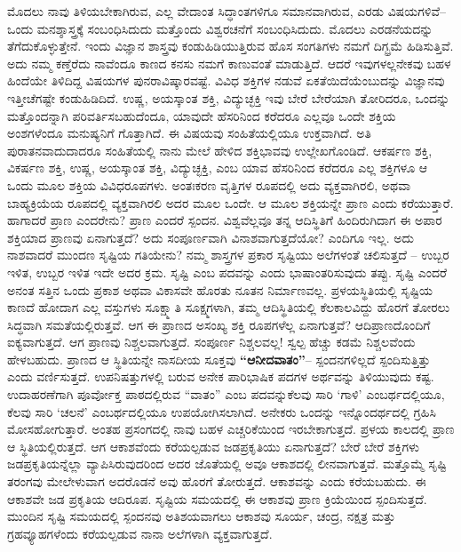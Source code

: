 ಮೊದಲು ನಾವು ತಿಳಿಯಬೇಕಾಗಿರುವ, ಎಲ್ಲ ವೇದಾಂತ ಸಿದ್ಧಾಂತಗಳಿಗೂ ಸಮಾನವಾಗಿರುವ, ಎರಡು ವಿಷಯಗಳಿವೆ–ಒಂದು ಮನಶ್ಶಾಸ್ತ್ರಕ್ಕೆ ಸಂಬಂಧಿಸಿದುದು ಮತ್ತೊಂದು ವಿಶ್ವರಚನೆಗೆ ಸಂಬಂಧಿಸಿದುದು. ಮೊದಲು ಎರಡನೆಯದನ್ನು ತೆಗೆದುಕೊಳ್ಳುತ್ತೇನೆ. ಇಂದು ವಿಜ್ಞಾನ ಶಾಸ್ತ್ರವು ಕಂಡುಹಿಡಿಯುತ್ತಿರುವ ಹೊಸ ಸಂಗತಿಗಳು ನಮಗೆ ದಿಗ್ಭ್ರಮೆ ಹಿಡಿಸುತ್ತಿವೆ. ಅದು ನಮ್ಮ ಕಣ್ತೆರೆದು ನಾವೆಂದೂ ಕಾಣದ ಕನಸು ನಮಗೆ ಕಾಣುವಂತೆ ಮಾಡುತ್ತಿದೆ. ಆದರೆ ಇವುಗಳಲ್ಲನೇಕವು ಬಹಳ ಹಿಂದೆಯೇ ತಿಳಿದಿದ್ದ ವಿಷಯಗಳ ಪುನರಾವಿಷ್ಕಾರವಷ್ಟೆ. ವಿವಿಧ ಶಕ್ತಿಗಳ ನಡುವೆ ಏಕತೆಯಿದೆಯೆಂಬುದನ್ನು ವಿಜ್ಞಾನವು ಇತ್ತೀಚೆಗಷ್ಟೇ ಕಂಡುಹಿಡಿದಿದೆ. ಉಷ್ಣ, ಅಯಸ್ಕಾಂತ ಶಕ್ತಿ, ವಿದ್ಯುಚ್ಛಕ್ತಿ ಇವು ಬೇರೆ ಬೇರೆಯಾಗಿ ತೋರಿದರೂ, ಒಂದನ್ನು ಮತ್ತೊಂದನ್ನಾಗಿ ಪರಿವರ್ತಿಸಬಹುದೆಂದೂ, ಯಾವುದೇ ಹೆಸರಿನಿಂದ ಕರೆದರೂ ಎಲ್ಲವೂ ಒಂದೇ ಶಕ್ತಿಯ ಅಂಶಗಳೆಂದೂ ಮನುಷ್ಯನಿಗೆ ಗೊತ್ತಾಗಿದೆ. ಈ ವಿಷಯವು ಸಂಹಿತೆಯಲ್ಲಿಯೂ ಉಕ್ತವಾಗಿದೆ. ಅತಿ ಪುರಾತನವಾದುದಾದರೂ ಸಂಹಿತೆಯಲ್ಲಿ ನಾನು ಮೇಲೆ ಹೇಳಿದ ಶಕ್ತಿಭಾವವು ಉಲ್ಲೇಖಗೊಂಡಿದೆ. ಆಕರ್ಷಣ ಶಕ್ತಿ, ವಿಕರ್ಷಣ ಶಕ್ತಿ, ಉಷ್ಣ, ಅಯಸ್ಕಾಂತ ಶಕ್ತಿ, ವಿದ್ಯುಚ್ಛಕ್ತಿ, ಎಂಬ ಯಾವ ಹೆಸರಿನಿಂದ ಕರೆದರೂ ಎಲ್ಲ ಶಕ್ತಿಗಳೂ ಆ ಒಂದು ಮೂಲ ಶಕ್ತಿಯ ವಿವಿಧರೂಪಗಳು. ಅಂತಃಕರಣ ವೃತ್ತಿಗಳ ರೂಪದಲ್ಲಿ ಅದು ವ್ಯಕ್ತವಾಗಿರಲಿ, ಅಥವಾ ಬಾಹ್ಯಕ್ರಿಯೆಯ ರೂಪದಲ್ಲಿ ವ್ಯಕ್ತವಾಗಿರಲಿ ಅದರ ಮೂಲ ಒಂದೇ. ಆ ಮೂಲ ಶಕ್ತಿಯನ್ನೇ ಪ್ರಾಣ ಎಂದು ಕರೆಯುತ್ತಾರೆ. ಹಾಗಾದರೆ ಪ್ರಾಣ ಎಂದರೇನು? ಪ್ರಾಣ ಎಂದರೆ ಸ್ಪಂದನ. ವಿಶ್ವವೆಲ್ಲವೂ ತನ್ನ ಆದಿಸ್ಥಿತಿಗೆ ಹಿಂದಿರುಗಿದಾಗ ಈ ಅಪಾರ ಶಕ್ತಿಯಾದ ಪ್ರಾಣವು ಏನಾಗುತ್ತದೆ? ಅದು ಸಂಪೂರ್ಣವಾಗಿ ವಿನಾಶವಾಗುತ್ತದೆಯೋ? ಎಂದಿಗೂ ಇಲ್ಲ. ಅದು ನಾಶವಾದರೆ ಮುಂದಣ ಸೃಷ್ಟಿಯ ಗತಿಯೇನು? ನಮ್ಮ ಶಾಸ್ತ್ರಗಳ ಪ್ರಕಾರ ಸೃಷ್ಟಿಯು ಅಲೆಗಳಂತೆ ಚಲಿಸುತ್ತದೆ – ಉಬ್ಬರ ಇಳಿತ, ಉಬ್ಬರ ಇಳಿತ ಇದೇ ಅದರ ಕ್ರಮ. ಸೃಷ್ಟಿ ಎಂಬ ಪದವನ್ನು  ಎಂದು ಭಾಷಾಂತರಿಸುವುದು ತಪ್ಪು. ಸೃಷ್ಟಿ ಎಂದರೆ ಅನಂತ ಸತ್ತಿನ ಒಂದು ಪ್ರಕಾಶ ಅಥವಾ ವಿಕಾಸವೇ ಹೊರತು ನೂತನ ನಿರ್ಮಾಣವಲ್ಲ. ಪ್ರಳಯಸ್ಥಿತಿಯಲ್ಲಿ ಸೃಷ್ಟಿಯ ಕಾಣದೆ ಹೋದಾಗ ಎಲ್ಲ ವಸ್ತುಗಳು ಸೂಕ್ಷ್ಮಾತಿ ಸೂಕ್ಷ್ಮಗಳಾಗಿ, ತಮ್ಮ ಆದಿಸ್ಥಿತಿಯಲ್ಲಿ ಕೆಲಕಾಲವಿದ್ದು ಹೊರಗೆ ತೋರಲು ಸಿದ್ಧವಾಗಿ ಸಮತೆಯಲ್ಲಿರುತ್ತವೆ. ಆಗ ಈ ಪ್ರಾಣದ ಅಸಂಖ್ಯ ಶಕ್ತಿ ರೂಪಗಳೆಲ್ಲ ಏನಾಗುತ್ತವೆ? ಆದಿಪ್ರಾಣದೊಂದಿಗೆ ಐಕ್ಯವಾಗುತ್ತದೆ. ಆಗ ಪ್ರಾಣವು ನಿಶ್ಚಲವಾಗುತ್ತದೆ. ಸಂಪೂರ್ಣ ನಿಶ್ಚಲವಲ್ಲ! ಸ್ವಲ್ಪ ಹೆಚ್ಚು ಕಡಮೆ ನಿಶ್ಚಲವೆಂದು ಹೇಳಬಹುದು. ಪ್ರಾಣದ ಆ ಸ್ಥಿತಿಯನ್ನೇ ನಾಸದೀಯ ಸೂಕ್ತವು \textbf{“ಆನೀದವಾತಂ”}– ಸ್ಪಂದನಗಳಿಲ್ಲದೆ ಸ್ಪಂದಿಸುತ್ತಿತ್ತು ಎಂದು ವರ್ಣಿಸುತ್ತದೆ. ಉಪನಿಷತ್ತುಗಳಲ್ಲಿ ಬರುವ ಅನೇಕ ಪಾರಿಭಾಷಿಕ ಪದಗಳ ಅರ್ಥವನ್ನು ತಿಳಿಯುವುದು ಕಷ್ಟ. ಉದಾಹರಣೆಗಾಗಿ ಪೂರ್ವೋಕ್ತ ಪಾಠದಲ್ಲಿರುವ “ವಾತಂ” ಎಂಬ ಪದವನ್ನುಕೆಲವು ಸಾರಿ ‘ಗಾಳಿ’ ಎಂಬರ್ಥದಲ್ಲಿಯೂ, ಕೆಲವು ಸಾರಿ ‘ಚಲನೆ’ ಎಂಬರ್ಥದಲ್ಲಿಯೂ ಉಪಯೋಗಿಸಲಾಗಿದೆ. ಅನೇಕರು ಒಂದನ್ನು ಇನ್ನೊಂದರ್ಥದಲ್ಲಿ ಗ್ರಹಿಸಿ ಮೋಸಹೋಗುತ್ತಾರೆ. ಅಂತಹ ಪ್ರಸಂಗದಲ್ಲಿ ನಾವು ಬಹಳ ಎಚ್ಚರಿಕೆಯಿಂದ ಇರಬೇಕಾಗುತ್ತದೆ. ಪ್ರಳಯ ಕಾಲದಲ್ಲಿ ಪ್ರಾಣ ಆ ಸ್ಥಿತಿಯಲ್ಲಿರುತ್ತದೆ. ಆಗ ಆಕಾಶವೆಂದು ಕರೆಯಲ್ಪಡುವ ಜಡಪ್ರಕೃತಿಯು ಏನಾಗುತ್ತದೆ? ಬೇರೆ ಬೇರೆ ಶಕ್ತಿಗಳು ಜಡಪ್ರಕೃತಿಯನ್ನೆಲ್ಲಾ ವ್ಯಾಪಿಸಿರುವುದರಿಂದ ಅದರ ಜೊತೆಯಲ್ಲಿ ಅವೂ ಆಕಾಶದಲ್ಲಿ ಲೀನವಾಗುತ್ತವೆ. ಮತ್ತೊಮ್ಮೆ ಸೃಷ್ಟಿ ತರಂಗವು ಮೇಲೇಳುವಾಗ ಅದರೊಡನೆ ಅವು ಹೊರಗೆ ತೋರುತ್ತದೆ. ಆಕಾಶವನ್ನು  ಎಂದು ಕರೆಯಬಹುದು. ಈ ಆಕಾಶವೇ ಜಡ ಪ್ರಕೃತಿಯ ಆದಿರೂಪ. ಸೃಷ್ಟಿಯ ಸಮಯದಲ್ಲಿ ಈ ಆಕಾಶವು ಪ್ರಾಣ ಕ್ರಿಯೆಯಿಂದ ಸ್ಪಂದಿಸುತ್ತದೆ. ಮುಂದಿನ ಸೃಷ್ಟಿ ಸಮಯದಲ್ಲಿ ಸ್ಪಂದನವು ಅತಿಶಯವಾಗಲು ಆಕಾಶವು ಸೂರ್ಯ, ಚಂದ್ರ, ನಕ್ಷತ್ರ ಮತ್ತು ಗ್ರಹವ್ಯೂಹಗಳೆಂದು ಕರೆಯಲ್ಪಡುವ ನಾನಾ ಅಲೆಗಳಾಗಿ ವ್ಯಕ್ತವಾಗುತ್ತದೆ. 

